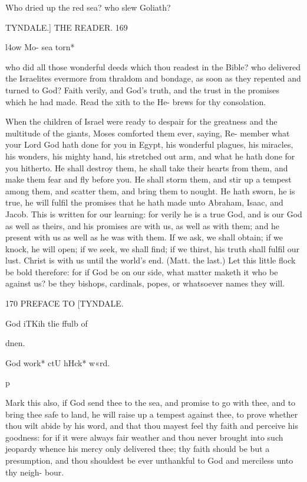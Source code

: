 \documentclass{custom}
\begin{document}
Who dried up the red sea? who slew Goliath? 



TYNDALE.] 
THE READER. 
169 

l4ow Mo- 
sea torn* 

who did all those wonderful deeds which thou 
readest in the Bible? who delivered the Israelites 
evermore from thraldom and bondage, as soon as 
they repented and turned to God? Faith verily, 
and God's truth, and the trust in the promises 
which he had made. Read the xith to the He- 
brews for thy consolation. 

When the children of Israel were ready to 
despair for the greatness and the multitude of the 
giants, Moses comforted them ever, saying, Re- 
member what your Lord God hath done for you 
in Egypt, his wonderful plagues, his miracles,
his wonders, his mighty hand, his stretched out 
arm, and what he hath done for you hitherto. He 
shall destroy them, he shall take their hearts 
from them, and make them fear and fly before 
you. He shall storm them, and stir up a tempest 
among them, and scatter them, and bring them to 
nought. He hath sworn, he is true, he will fulfil 
the promises that he hath made unto Abraham, 
Isaac, and Jacob. This is written for our learning: 
for verily he is a true God, and is our God as
well as theirs, and his promises are with us, as
well as with them; and he present with us as well 
as he was with them. If we ask, we shall obtain; 
if we knock, he will open; if we seek, we shall 
find; if we thirst, his truth shall fulfil our lust. 
Christ is with us until the world's end. (Matt. 
the last.) Let this little flock be bold therefore: 
for if God be on our side, what matter maketh 
it who be against us? be they bishops, cardinals, 
popes, or whatsoever names they will.


170 
PREFACE TO 
[TYNDALE. 

God iTKih 
tlie ffulb of 

dnen. 

God work* 
ctU hHck* 
w«rd. 

p 



Mark this also, if God send thee to the sea, 
and promise to go with thee, and to bring 
thee safe to land, he will raise up a tempest 
against thee, to prove whether thou wilt abide 
by his word, and that thou mayest feel thy 
faith and perceive his goodness: for if it 
were always fair weather and thou never 
brought into such jeopardy whence his mercy 
only delivered thee; thy faith should be but 
a presumption, and thou shouldest be ever 
unthankful to God and merciless unto thy neigh- 
bour.
\end{document}
